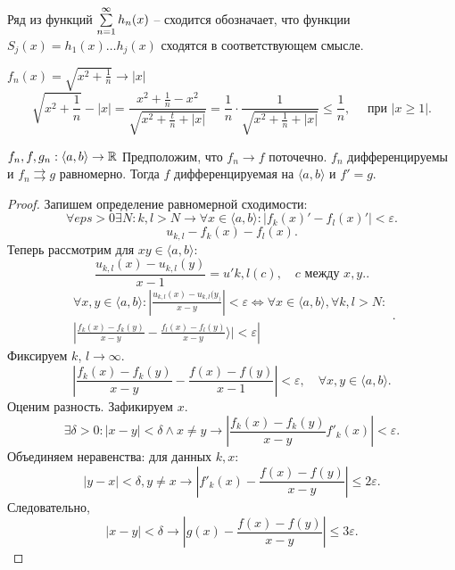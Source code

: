 \documentclass[12pt]{report}
\begin{document}
\begin{name}
    Ряд из функций $\sum\limits_{n=1}^{\infty} h_n(x)$ -- сходится обозначает, что функции $S_j(x) = h_1(x) \ldots  h_j(x)$  сходятся в соответствующем смысле.
\end{name}
\begin{ex}
    $f_n(x) = \sqrt{x^2 + \frac{1}{n}} \to  |x|$
    \[
	\sqrt{x^2 + \frac{1}{n} }- |x| = \frac{x^2 + \frac{1}{n}  - x^2}{\sqrt{x^2 + \frac{t}{n} + |x|}} = \frac{1}{n }\cdot \frac{1}{\sqrt{x ^2 + \frac{1}{n} + |x|}} \le  \frac{1}{n}, \quad \text{ при } |x \ge  1|
    .\] 
\end{ex}
\begin{thm}
    $f_n, f, g_n : \langle a, b \rangle  \to  \mathbb{R}$ Предположим, что $f_n \to  f$ поточечно.
    $f_n$ дифференцируемы и $f_n \rightrightarrows g$ равномерно. Тогда $f$  дифференцируемая на $\langle a, b \rangle$ и $f '= g$.
\end{thm}
\begin{proof}
    Запишем определение равномерной сходимости:
    \[
	\forall  eps >0 \exists  N : k, l > N \to  \forall  x \in  \langle a, b\rangle : |f_k(x) ' - f_l(x) '| < \varepsilon 
    .\] 
    \[
	u_{k, l} - f_k(x) - f_l(x)
    .\] 
    Теперь рассмотрим для $x y \in  \langle a, b \rangle:$
    \[
	\frac{u_{k, l} (x)  - u_{k, l} (y)}{x-1} = u'{k,l}(c), \quad c \text{ между } x, y.
    .\] 
    \[
	\begin{array}{r}
	\forall x, y \in  \langle a, b \rangle : \left | \frac{u_{k, l} (x) - u_{k, l} (y_)}{x - y} \right | < \varepsilon  \Longleftrightarrow \forall  x \in  \langle a, b \rangle , \forall  k, l > N:\\
	\left | \frac{f_k(x) - f_k(y) }{x-y} - \frac{f_l(x) - f_l(y)}{x-y} \rangle | < \varepsilon 
	\right |
    \end{array}
    .\] 
    Фиксируем $k$, $l \to  \infty$. 
\[
    \left | \frac{f_k(x) - f_k(y)}{x - y} - \frac{f(x) - f(y)}{x-1} \right | < \varepsilon  , \quad \forall  x, y \in  \langle a, b \rangle 
.\] 
Оценим разность. Зафикируем $ x$.
\[
    \exists  \delta  >0 : |x-y| < \delta  \wedge x \ne y\to  |\frac{f_k(x) - f_k(y)}{x-y} f'_k(x)|  < \varepsilon 
.\] 
Объединяем неравенства: 
для данных $ k, x$:
\[
    |y - x| < \delta  , y \ne x \to  |f'_k(x) - \frac{f(x) - f(y)}{x-y}| \le  2 \varepsilon 
.\] 
Следовательно,
\[
    |x - y| < \delta \to  |g(x) - \frac{f(x) - f(y)}{x-y}| \le 3 \varepsilon 
.\] 
\end{proof}
\end{document}
